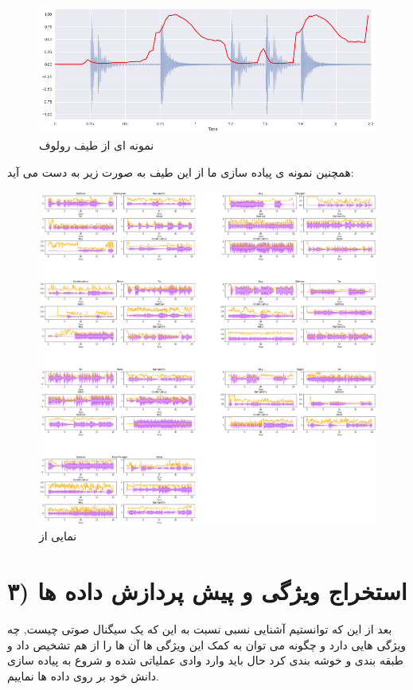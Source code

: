 \documentclass{article}
\begin{document}
\begin{figure}[h]
	\centering
	\includegraphics[width=0.7\linewidth]{Photo/9}
	\caption[نمونه ای از طیف رولوف]{نمونه ای از طیف رولوف}
	\label{fig:9}
\end{figure}
همچنین نمونه ی پیاده سازی ما از این طیف به صورت زیر به دست می آيد:
\begin{figure}[h]
	\centering
	\includegraphics[width=0.7\linewidth]{Photo/30}
	\caption[نمایی از ]{نمایی از }
	\label{fig:30}
\end{figure}

\section{۳) استخراج ویژگی و پیش پردازش داده ها}
بعد از این که توانستیم آشنایی نسبی نسبت به این که یک سیگنال صوتی چیست, چه ویژگی هایی دارد و چگونه می توان به کمک این ویژگی ها آن ها را از هم تشخیص داد و طبقه بندی و خوشه بندی کرد حال باید وارد وادی عملیاتی شده و شروع به پیاده سازی دانش خود بر روی داده ها نماییم.
\end{document}
